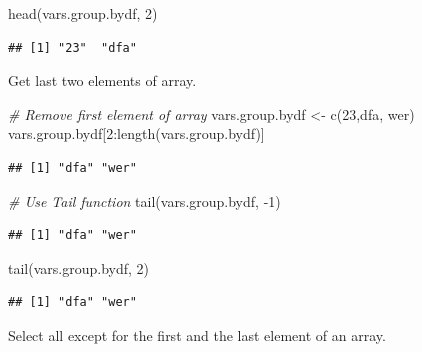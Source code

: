 \documentclass[
]{book}
\newenvironment{Shaded}{\begin{snugshade}}{\end{snugshade}}
\newcommand{\CommentTok}[1]{\textcolor[rgb]{0.56,0.35,0.01}{\textit{#1}}}
\newcommand{\DecValTok}[1]{\textcolor[rgb]{0.00,0.00,0.81}{#1}}
\newcommand{\FunctionTok}[1]{\textcolor[rgb]{0.00,0.00,0.00}{#1}}
\newcommand{\NormalTok}[1]{#1}
\newcommand{\OtherTok}[1]{\textcolor[rgb]{0.56,0.35,0.01}{#1}}
\newcommand{\SpecialCharTok}[1]{\textcolor[rgb]{0.00,0.00,0.00}{#1}}
\newcommand{\StringTok}[1]{\textcolor[rgb]{0.31,0.60,0.02}{#1}}
\begin{document}
\begin{Shaded}
\begin{Highlighting}[]
\FunctionTok{head}\NormalTok{(vars.group.bydf, }\DecValTok{2}\NormalTok{)}
\end{Highlighting}
\end{Shaded}

\begin{verbatim}
## [1] "23"  "dfa"
\end{verbatim}

Get last two elements of array.

\begin{Shaded}
\begin{Highlighting}[]
\CommentTok{\# Remove first element of array}
\NormalTok{vars.group.bydf }\OtherTok{\textless{}{-}} \FunctionTok{c}\NormalTok{(}\StringTok{\textquotesingle{}23\textquotesingle{}}\NormalTok{,}\StringTok{\textquotesingle{}dfa\textquotesingle{}}\NormalTok{, }\StringTok{\textquotesingle{}wer\textquotesingle{}}\NormalTok{)}
\NormalTok{vars.group.bydf[}\DecValTok{2}\SpecialCharTok{:}\FunctionTok{length}\NormalTok{(vars.group.bydf)]}
\end{Highlighting}
\end{Shaded}

\begin{verbatim}
## [1] "dfa" "wer"
\end{verbatim}

\begin{Shaded}
\begin{Highlighting}[]
\CommentTok{\# Use Tail function}
\FunctionTok{tail}\NormalTok{(vars.group.bydf, }\SpecialCharTok{{-}}\DecValTok{1}\NormalTok{)}
\end{Highlighting}
\end{Shaded}

\begin{verbatim}
## [1] "dfa" "wer"
\end{verbatim}

\begin{Shaded}
\begin{Highlighting}[]
\FunctionTok{tail}\NormalTok{(vars.group.bydf, }\DecValTok{2}\NormalTok{)}
\end{Highlighting}
\end{Shaded}

\begin{verbatim}
## [1] "dfa" "wer"
\end{verbatim}

Select all except for the first and the last element of an array.
\end{document}
